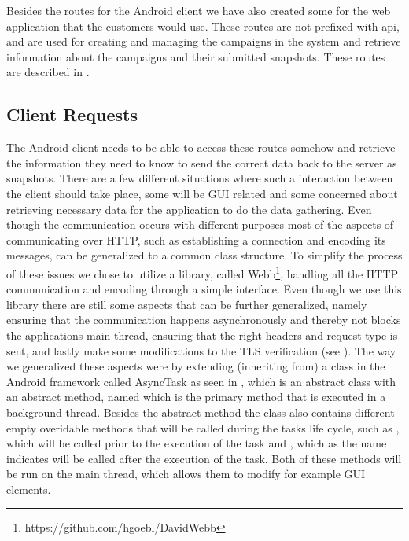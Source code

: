Besides the routes for the Android client we have also created some for the web application that the customers would use. These routes are not prefixed with api, and are used for creating and managing the campaigns in the system and retrieve information about the campaigns and their submitted snapshots. These routes are described in . 

\subsection{Client Requests}
\label{sub:client_requests}
The Android client needs to be able to access these routes somehow and retrieve the information they need to know to send the correct data back to the server as snapshots. There are a few different situations where such a interaction between the client should take place, some will be GUI related and some concerned about retrieving necessary data for the application to do the data gathering. Even though the communication occurs with different purposes most of the aspects of communicating over HTTP, such as establishing a connection and encoding its messages, can be generalized to a common class structure. To simplify the process of these issues we chose to utilize a library, called Webb\footnote{https://github.com/hgoebl/DavidWebb}, handling all the HTTP communication and encoding through a simple interface. Even though we use this library there are still some aspects that can be further generalized, namely ensuring that the communication happens asynchronously and thereby not blocks the applications main thread, ensuring that the right headers and request type is sent, and lastly make some modifications to the TLS verification (see ). The way we generalized these aspects were by extending (inheriting from) a class in the Android framework called AsyncTask as seen in , which is an abstract class with an abstract method, named  which is the primary method that is executed in a background thread. Besides the abstract method the class also contains different empty overidable methods that will be called during the tasks life cycle, such as , which will be called prior to the execution of the task and , which as the name indicates will be called after the execution of the task. Both of these methods will be run on the main thread, which allows them to modify for example GUI elements. 

